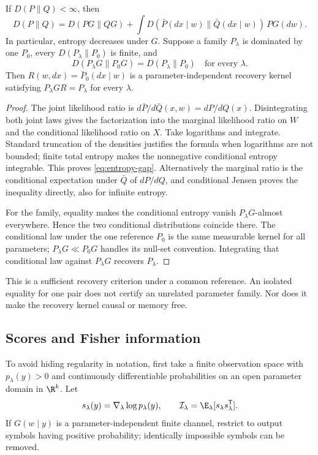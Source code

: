 \begin{theorem}\label{thm:entropy-gap}
If $D(P\|Q)<\infty$, then
\begin{equation}\label{eq:entropy-gap}
 D(P\|Q)=D(PG\|QG)+
 \int D(\bar P(dx\mid w)\|\bar Q(dx\mid w))\,PG(dw).
\end{equation}
In particular, entropy decreases under $G$. Suppose a family $P_\lambda$
is dominated by one $P_0$, every $D(P_\lambda\|P_0)$ is finite, and
\[
 D(P_\lambda G\|P_0G)=D(P_\lambda\|P_0)
 \quad\text{for every }\lambda.
\]
Then $R(w,dx)=\bar P_0(dx\mid w)$ is a parameter-independent recovery
kernel satisfying $P_\lambda GR=P_\lambda$ for every $\lambda$.
\end{theorem}
\begin{proof}
The joint likelihood ratio is $d\bar P/d\bar Q(x,w)=dP/dQ(x)$.
Disintegrating both joint laws gives the factorization into the marginal
likelihood ratio on $W$ and the conditional likelihood ratio on $X$.
Take logarithms and integrate. Standard truncation of the densities
justifies the formula when logarithms are not bounded; finite total
entropy makes the nonnegative conditional entropy integrable. This proves
\eqref{eq:entropy-gap}. Alternatively the marginal ratio is the conditional
expectation under $\bar Q$ of $dP/dQ$, and conditional Jensen proves the
inequality directly, also for infinite entropy.

For the family, equality makes the conditional entropy vanish
$P_\lambda G$-almost everywhere. Hence the two conditional distributions
coincide there. The conditional law under the one reference $P_0$ is the
same measurable kernel for all parameters; $P_\lambda G\ll P_0G$ handles
its null-set convention. Integrating that conditional law against
$P_\lambda G$ recovers $P_\lambda$.
\end{proof}

This is a sufficient recovery criterion under a common reference. An
isolated equality for one pair does not certify an unrelated parameter
family. Nor does it make the recovery kernel causal or memory free.

\subsection{Scores and Fisher information}
To avoid hiding regularity in notation, first take a finite observation
space with $p_\lambda(y)>0$ and continuously differentiable probabilities
on an open parameter domain in $\R^k$. Let
\[
 s_\lambda(y)=\nabla_\lambda\log p_\lambda(y),
 \qquad\mathcal I_\lambda=\E_\lambda[s_\lambda s_\lambda^{\mathsf T}].
\]
If $G(w\mid y)$ is a parameter-independent finite channel, restrict to
output symbols having positive probability; identically impossible symbols
can be removed.

